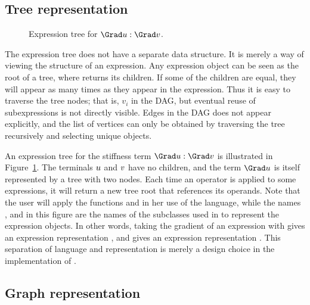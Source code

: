 \subsection{Tree representation}

\begin{figure}
  \caption{Expression tree for $\Grad \uu : \Grad \vv$.}
  \label{ufl:fig:stiffness}
\end{figure}

The expression tree does not have a separate data structure. It is merely
a way of viewing the structure of an expression. Any expression object
 can be seen as the root of a tree, where 
returns its children. If some of the children are equal, they will
appear as many times as they appear in the expression. Thus it is easy
to traverse the tree nodes; that is, $v_i$ in the DAG, but eventual
reuse of subexpressions is not directly visible. Edges in the DAG does
not appear explicitly, and the list of vertices can only be obtained by
traversing the tree recursively and selecting unique objects.

An expression tree for the stiffness term $\Grad\uu :\Grad\vv$ is
illustrated in Figure~\ref{ufl:fig:stiffness}.  The terminals ${u}$ and
${v}$ have no children, and the term $\Grad\uu$ is itself represented by a
tree with two nodes. Each time an operator is applied to some expressions,
it will return a new tree root that references its operands. Note that
the user will apply the functions  and  in her use of
the language, while the names ,  and 
in this figure are the names of the  subclasses used in \ufl{}
to represent the expression objects.  In other words, taking the gradient
of an expression with  gives an expression representation
, and  gives an expression representation
. This separation of language and representation is
merely a design choice in the implementation of \ufl{}.

\subsection{Graph representation} \label{ufl:sec:graphs}


